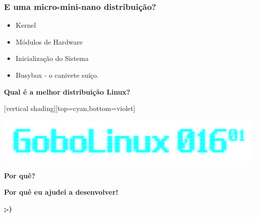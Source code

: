 \documentclass[aspectratio=169,14pt]{beamer}
\begin{document}
\begin{frame}
    \frametitle{E uma micro-mini-nano distribuição?}
    \begin{itemize}
        \item Kernel
        \item Módulos de Hardware
        \item Inicialização do Sistema
        \item Busybox - o canivete suíço.
    \end{itemize}
\end{frame}

\begin{frame}
    \begin{center}
    \huge \textbf{Qual é a melhor distribuição Linux?}
    \end{center}
\end{frame}

{
 [vertical shading][top=cyan,bottom=violet]
\begin{frame}
    \includegraphics[width=0.9\paperwidth]{../images/gobolinux.png}
\end{frame}
}

\begin{frame}
    \begin{center}
    \huge \textbf{Por quê?}
    \end{center}
\end{frame}

\begin{frame}
    \begin{center}
    \huge \textbf{Por quê eu ajudei a desenvolver!}

    \huge \textbf{;-)}
    \end{center}
\end{frame}
\end{document}
